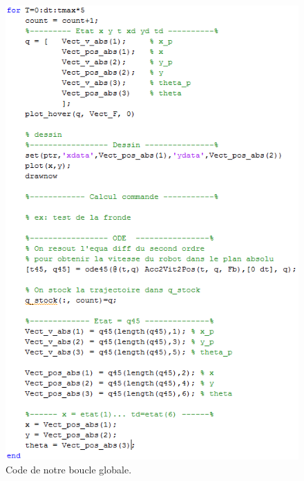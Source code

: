 \documentclass[a4paper,10pt]{article}
\begin{document}
\begin{figure}[H]
\bigcenter\includegraphics[scale=0.8]{images/boucle_for.png}
\caption{Code de notre boucle globale.}
\end{figure}
\end{document}
